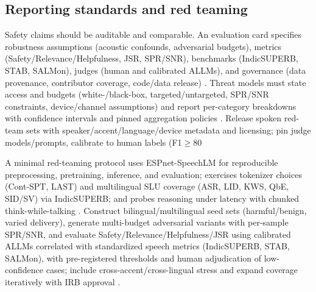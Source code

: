 \documentclass{article}
\begin{document}
\subsection{Reporting standards and red teaming} \label{subsec:Reporting standards and red teaming}
Safety claims should be auditable and comparable. An evaluation card specifies robustness assumptions (acoustic confounds, adversarial budgets), metrics (Safety/Relevance/Helpfulness, JSR, SPR/SNR), benchmarks (IndicSUPERB, STAB, SALMon), judges (human and calibrated ALLMs), and governance (data provenance, contributor coverage, code/data release) \cite{vashishth2024stabspeechtokenizerassessmentbenchmark,entry2025indicsuperbspeechprocessinguniversalperf,maimon2025salmonsuiteacousticlanguagemodelevaluati}. Threat models must state access and budgets (white-/black-box, targeted/untargeted, SPR/SNR constraints, device/channel assumptions) and report per-category breakdowns with confidence intervals and pinned aggregation policies \cite{peri2024speechguardexploringadversarialrobustnes}. Release spoken red-team sets with speaker/accent/language/device metadata and licensing; pin judge models/prompts, calibrate to human labels (F1$\ge$80%

A minimal red-teaming protocol uses ESPnet-SpeechLM for reproducible preprocessing, pretraining, inference, and evaluation; exercises tokenizer choices (Cont-SPT, LAST) and multilingual SLU coverage (ASR, LID, KWS, QbE, SID/SV) via IndicSUPERB; and probes reasoning under latency with chunked think-while-talking \cite{tian2025espnetspeechlmopenspeechlanguagemodeltoo,li2025continuousspeechtokenizertext,turetzky2024lastlanguagemodelawarespeechtokenization,entry2025indicsuperbspeechprocessinguniversalperf,chiang2025stitchsimultaneousthinkingtalkingchunked}. Construct bilingual/multilingual seed sets (harmful/benign, varied delivery), generate multi-budget adversarial variants with per-sample SPR/SNR, and evaluate Safety/Relevance/Helpfulness/JSR using calibrated ALLMs correlated with standardized speech metrics (IndicSUPERB, STAB, SALMon), with pre-registered thresholds and human adjudication of low-confidence cases; include cross-accent/cross-lingual stress and expand coverage iteratively with IRB approval \cite{peri2024speechguardexploringadversarialrobustnes,vashishth2024stabspeechtokenizerassessmentbenchmark,maimon2025salmonsuiteacousticlanguagemodelevaluati,fu2025personalizedsociallyassistiverobotsendsp}.
\end{document}
